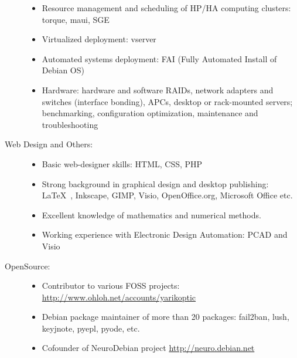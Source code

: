 \documentclass[12pt,overlapped,line]{res}
\newcommand{\wdescription}[1]{({\small \textit{#1}})}
\begin{document}
\begin{resume}
\begin{description}
\begin{itemize}
      \item Resource management and scheduling of HP/HA computing
        clusters: torque, maui, SGE

      \item Virtualized deployment: vserver

      \item Automated systems deployment: FAI (Fully Automated Install
        of Debian OS)

      \item Hardware: hardware and software RAIDs, network adapters
        and switches (interface bonding), APCs, desktop or
        rack-mounted servers; benchmarking, configuration
        optimization, maintenance and troubleshooting

      \end{itemize}

    \item[Web Design and Others:]  \hspace*{\fill}
      \begin{itemize}
      \item Basic web-designer skills: HTML, CSS, PHP%
      \item Strong background in graphical design and desktop
        publishing: \LaTeX\ , Inkscape, GIMP, Visio, OpenOffice.org, Microsoft Office etc.

      \item Excellent knowledge of mathematics and numerical methods.

      \item Working experience with Electronic Design Automation: PCAD and
        Visio
      \end{itemize}

   \item[{O}pen{S}ource:]\hspace*{\fill}
      \begin{itemize}
      \item Contributor to various FOSS projects: \url{http://www.ohloh.net/accounts/yarikoptic}

      \item Debian package maintainer of more than 20 packages: fail2ban,
        lush, keyjnote, pyepl, pyode, etc.

      \item Cofounder of NeuroDebian project \url{http://neuro.debian.net}


\end{itemize}
\end{description}
\end{resume}
\end{document}
